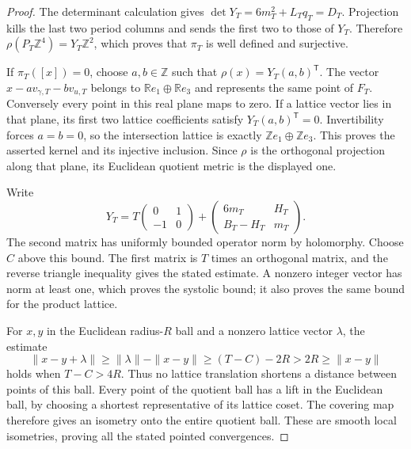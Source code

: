 \begin{proof}
The determinant calculation gives
$\det Y_T=6m_T^2+L_Tq_T=D_T$.  Projection kills the last two period
columns and sends the first two to those of $Y_T$.  Therefore
$\rho(P_T\mathbb Z^4)=Y_T\mathbb Z^2$, which proves that $\pi_T$ is
well defined and surjective.

If $\pi_T([x])=0$, choose $a,b\in\mathbb Z$ such that
$\rho(x)=Y_T(a,b)^{\mathsf T}$.  The vector
$x-av_{\gamma,T}-bv_{u,T}$ belongs to
$\mathbb Re_1\oplus\mathbb Re_3$ and represents the same point of
$F_T$.  Conversely every point in this real plane maps to zero.
If a lattice vector lies in that plane, its first two lattice
coefficients satisfy $Y_T(a,b)^{\mathsf T}=0$.  Invertibility forces
$a=b=0$, so the intersection lattice is exactly
$\mathbb Ze_1\oplus\mathbb Ze_3$.  This proves the asserted kernel and
its injective inclusion.  Since $\rho$ is the orthogonal projection
along that plane, its Euclidean quotient metric is the displayed one.

Write
\[
 Y_T=T\begin{pmatrix}0&1\\-1&0\end{pmatrix}
       +\begin{pmatrix}6m_T&H_T\\B_T-H_T&m_T\end{pmatrix}.
\]
The second matrix has uniformly bounded operator norm by holomorphy.
Choose $C$ above this bound.  The first matrix is $T$ times an orthogonal
matrix, and the reverse triangle inequality gives the stated estimate.
A nonzero integer vector has norm at least one, which proves the
systolic bound; it also proves the same bound for the product lattice.

For $x,y$ in the Euclidean radius-$R$ ball and a nonzero lattice vector
$\lambda$, the estimate
\[
 \|x-y+\lambda\|\geq\|\lambda\|-\|x-y\|
 \geq(T-C)-2R>2R\geq\|x-y\|
\]
holds when $T-C>4R$.  Thus no lattice translation shortens a distance
between points of this ball.  Every point of the quotient ball has a
lift in the Euclidean ball, by choosing a shortest representative of
its lattice coset.  The covering map therefore gives an isometry onto
the entire quotient ball.  These are smooth local isometries, proving
all the stated pointed convergences.
\end{proof}
